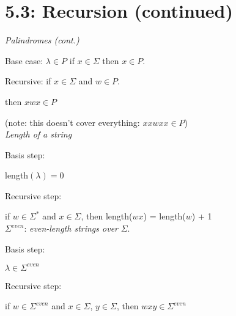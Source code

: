 \documentclass{exam}
\begin{document}
	
    \section{5.3: Recursion (continued)}
    
    \textit{Palindromes (cont.)}
    
    Base case: $\lambda \in P$ if $x \in \Sigma$ then $x \in P$.
    
    Recursive: if $x \in \Sigma$ and $w \in P$.
    
    then $xwx \in P$
    
    (note: this doesn't cover everything: $xxwxx \in P$)\\
    
    \textit{Length of a string}
    
    Basis step:
    
    length$(\lambda) = 0$
    
    Recursive step:
    
    if $w \in \Sigma^*$ and $x \in \Sigma$, then length($wx$) = length($w$) + 1\\
    
    
    $\Sigma^{even}$: \textit{even-length strings over} $\Sigma$.
    
    Basis step:
    
    $\lambda \in \Sigma^{even}$
    
    Recursive step:
    
    if $w \in \Sigma^{even}$ and $x \in \Sigma$, $y \in \Sigma$, then $wxy \in \Sigma^{even}$
    
    
\end{document}
